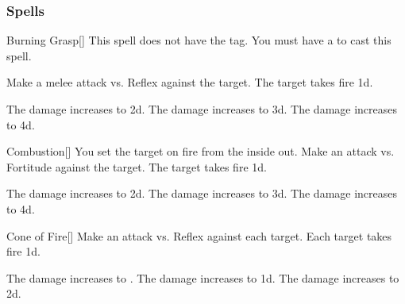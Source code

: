 \subsubsection{Spells}


\lowercase{\hypertarget{spell:Burning Grasp}{}}\label{spell:Burning Grasp}
\begin{freeability}[Rank 1]{\hypertarget{spell:Burning Grasp}{Burning Grasp}}[]
This spell does not have the  tag.
You must have a  to cast this spell.

Make a melee attack vs. Reflex against the target.
\hit The target takes fire  \plus1d.

\rankline
{} The damage increases to  \plus2d.
 The damage increases to  \plus3d.
 The damage increases to  \plus4d.
\end{freeability}
\vspace{0.25em}



\lowercase{\hypertarget{spell:Combustion}{}}\label{spell:Combustion}
\begin{freeability}[Rank 1]{\hypertarget{spell:Combustion}{Combustion}}[]
You set the target on fire from the inside out.
Make an attack vs. Fortitude against the target.
\hit The target takes fire  \plus1d.

\rankline
{} The damage increases to  \plus2d.
 The damage increases to  \plus3d.
 The damage increases to  \plus4d.
\end{freeability}
\vspace{0.25em}



\lowercase{\hypertarget{spell:Cone of Fire}{}}\label{spell:Cone of Fire}
\begin{freeability}[Rank 1]{\hypertarget{spell:Cone of Fire}{Cone of Fire}}[]
Make an attack vs. Reflex against each target.
\hit Each target takes fire  \minus1d.

\rankline
{} The damage increases to .
 The damage increases to  \plus1d.
 The damage increases to  \plus2d.
\end{freeability}
\vspace{0.25em}



